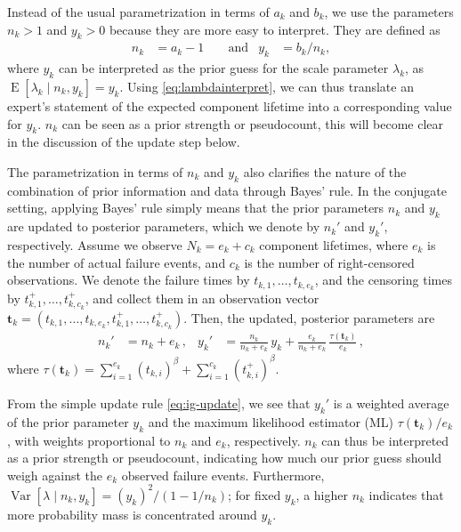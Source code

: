 \documentclass[authoryear]{elsarticle}
\renewcommand{\vec}[1]{{\bm#1}}
\newcommand{\uz}{^{(0)}} %
\newcommand{\un}{^{(n)}} %
\newcommand{\E}{\operatorname{E}}
\newcommand{\V}{\operatorname{Var}}
\newcommand{\nk}{n_k}
\newcommand{\nkp}{n_k'}
\newcommand{\yk}{y_k}
\newcommand{\ykp}{y_k'}
\def\tautk{\tau(\vec{t}_k)}
\begin{document}
Instead of the usual parametrization in terms of $a_k$ and $b_k$,
we use the parameters $\nk > 1$ and $\yk > 0$
because they are more easy to interpret.
They are defined as
\begin{align}
\nk &= a_k - 1 & &\text{ and}
&
\yk &= b_k / \nk,
\label{eq:abtony}
\end{align}
where $\yk$ can be interpreted as the prior guess for the scale parameter $\lambda_k$,
as $\E[\lambda_k\mid\nk,\yk] = \yk$.
Using \eqref{eq:lambdainterpret},
we can thus translate an expert's statement of the expected component lifetime into a corresponding value for $\yk$.
$\nk$ can be seen as a prior strength or pseudocount,
this will become clear in the discussion of the update step below.

The parametrization in terms of $\nk$ and $\yk$ also clarifies the nature of the combination
of prior information and data through Bayes' rule.
In the conjugate setting,
applying Bayes' rule simply means that the prior parameters $\nk$ and $\yk$
are updated to posterior parameters, which we denote by $\nkp$ and $\ykp$, respectively.
Assume we observe $N_k = e_k + c_k$ component lifetimes,
where $e_k$ is the number of actual failure events,
and $c_k$ is the number of right-censored observations.
We denote the failure times by $t_{k,1}, \ldots, t_{k,e_k}$,
and the censoring times by $t^+_{k,1}, \ldots, t^+_{k,c_k}$,
and collect them in an observation vector $\vec{t}_k = (t_{k,1}, \ldots, t_{k,e_k}, t^+_{k,1}, \ldots, t^+_{k,c_k})$.
Then, the updated, posterior parameters are
\begin{align}
\nkp &= \nk + e_k\,, 
&
\ykp &=  \frac{\nk}{\nk + e_k}\, \yk + \frac{e_k}{\nk + e_k}\, \frac{\tautk}{e_k}\,,
\label{eq:ig-update}
\end{align}
where $\tautk = \sum_{i=1}^{e_k} (t_{k,i})^\beta + \sum_{i=1}^{c_k} (t^+_{k,i})^\beta$.

From the simple update rule \eqref{eq:ig-update}, we see that
$\ykp$ is a weighted average of the prior parameter $\yk$ and the maximum likelihood estimator (ML) $\tautk/e_k$,
with weights proportional to $\nk$ and $e_k$, respectively.
$\nk$ can thus be interpreted as a prior strength or pseudocount,
indicating how much our prior guess should weigh against the $e_k$ observed failure events.
Furthermore, $\V[\lambda\mid\nk,\yk] = (\yk)^2 / (1 - 1/\nk)$;
for fixed $\yk$, a higher $\nk$ indicates 
that more probability mass is concentrated around $\yk$.
\end{document}
